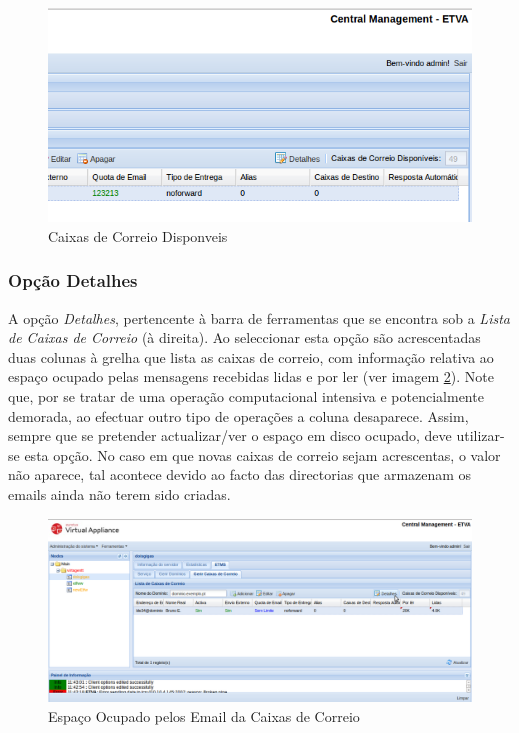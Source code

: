 \begin{figure}[H]
    \begin{center}
    \includegraphics[scale=0.4]{screenshots/etms/etms_free_mb.png}
    \caption{Caixas de Correio Disponveis}
    \label{fig:etms_free_mb}
    \end{center}
\end{figure}


\subsubsection{Opção Detalhes}
\label{sec:etms_sub_detalhes_caixas_correio}
A opção \textit{Detalhes}, pertencente à barra de ferramentas que se encontra sob a \textit{Lista de Caixas de Correio} (à direita). Ao seleccionar esta opção são acrescentadas duas colunas à grelha que lista as caixas de correio, com informação relativa ao espaço ocupado pelas mensagens recebidas lidas e por ler (ver imagem \ref{fig:etms_mb_space}). Note que, por se tratar de uma operação computacional intensiva e potencialmente demorada, ao efectuar outro tipo de operações a coluna desaparece. Assim, sempre que se pretender actualizar/ver o espaço em disco ocupado, deve utilizar-se esta opção. No caso em que novas caixas de correio sejam acrescentas, o valor não aparece, tal acontece devido ao facto das directorias que armazenam os emails ainda não terem sido criadas.

\begin{figure}[H]
    \begin{center}
    \includegraphics[scale=0.35]{screenshots/etms/etms_mb_space.png}
    \caption{Espaço Ocupado pelos Email da Caixas de Correio}
    \label{fig:etms_mb_space}
    \end{center}
\end{figure}



